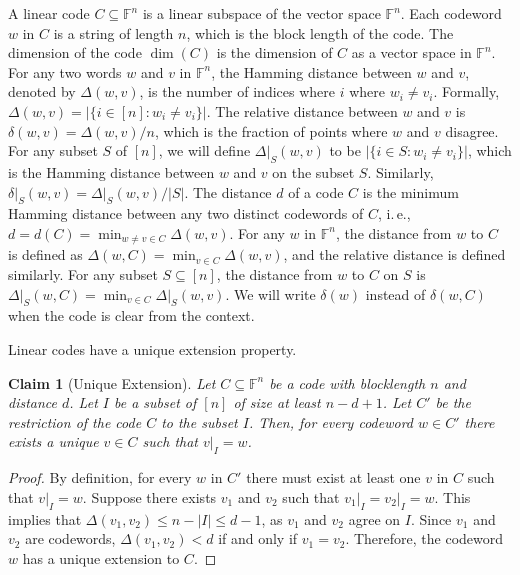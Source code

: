 \documentclass[11pt]{article}
\numberwithin{equation}{section}
\newtheorem{claim}[theorem]{Claim}
\theoremstyle{definition}
\theoremstyle{plain}
\newcommand{\ie}{i.\,e.}
\theoremstyle{plain}
\newcommand{\colored}{}
\newcommand{\reldist}{\colored{\delta}}
\newcommand{\hamdist}{\colored{\Delta}} %
\newcommand{\codedist}{\colored{d}} %
\newcommand{\blocklength}{\colored{n}} %
\newcommand{\Field}{\colored{\mathbb F}}
\newcommand{\word}{\colored{w}}
\newcommand{\otherword}{\colored{v}}
\newcommand\abs[1]{\colored{\left|#1\right|}}
\begin{document}
A linear code $C \subseteq \Field^{\blocklength}$ is a linear subspace of the vector space $\Field^{\blocklength}$. Each codeword $\word$ in $C$ is a string of length $\blocklength$, which is the block length of the code. The dimension of the code $\dim(C)$ is the dimension of $C$ as a vector space in $\Field^n$. For any two words $\word$ and $\otherword$ in $\Field^{\blocklength}$, the Hamming distance between $\word$ and $\otherword$, denoted by $\hamdist(\word,\otherword)$, is the number of indices where $i$ where $\word_i \ne \otherword_i$. Formally, $\hamdist(\word,\otherword) = \abs{\{i \in [\blocklength] : \word_i \ne \otherword_i\}}$. The relative distance between $\word$ and $\otherword$ is $\reldist(\word,\otherword) = \hamdist(\word,\otherword)/\blocklength$, which is the fraction of points where $\word$ and $\otherword$ disagree. For any subset $S$ of $[\blocklength]$, we will define $\hamdist \vert_S(\word,\otherword)$ to be $\abs{\{i \in S : \word_i \ne \otherword_i\}}$, which is the Hamming distance between $\word$ and $\otherword$ on the subset $S$. Similarly, $\reldist \vert_S(\word,\otherword) = \hamdist \vert_S (\word,\otherword) / \abs{S}$. The distance $\codedist$ of a code $C$ is the minimum Hamming distance between any two distinct codewords of $C$, \ie, $d = d(C) = \min_{\word \neq \otherword \in C} \hamdist(\word,\otherword)$. For any $\word$ in $\Field^{\blocklength}$, the distance from $\word$ to $C$ is defined as $\hamdist(\word,C) =\min_{\otherword \in C} \hamdist(\word,\otherword)$, and the relative distance is defined similarly. For any subset $S \subseteq [\blocklength]$, the distance from $\word$ to $C$ on $S$ is $\hamdist \vert_S (\word, C) = \min_{\otherword \in C} \hamdist \vert_S(\word,\otherword)$. We will write $\reldist(\word)$ instead of $\reldist(\word,C)$ when the code is clear from the context.

Linear codes have a unique extension property.
\begin{claim}[Unique Extension]\label{claim:ext}
Let $C \subseteq \Field^{\blocklength}$ be a code with blocklength $\blocklength$ and distance $\codedist$.
Let $I$ be a subset of $[\blocklength]$ of size at least $\blocklength - \codedist + 1$. Let $C'$ be the restriction of the code $C$ to the subset $I$.
Then, for every codeword $\word \in C'$ there exists a unique $\otherword \in C$ such that $\otherword \vert_I = \word$.
\end{claim}
\begin{proof}
By definition, for every $\word$ in $C'$ there must exist at least one $\otherword$ in $C$ such that $\otherword \vert_I = \word$. Suppose there exists $\otherword_1$ and $\otherword_2$ such that $\otherword_1 \vert_I = \otherword_2 \vert_I = \word$. This implies that $\hamdist(\otherword_1, \otherword_2) \leq \blocklength - \abs{I} \leq \codedist - 1$, as $\otherword_1$ and $\otherword_2$ agree on $I$. Since $\otherword_1$ and $\otherword_2$ are codewords, $\hamdist(\otherword_1,\otherword_2) < \codedist$ if and only if $\otherword_1 = \otherword_2$. Therefore, the codeword $\word$ has a unique extension to $C$.
\end{proof}
%
%
\end{document}
